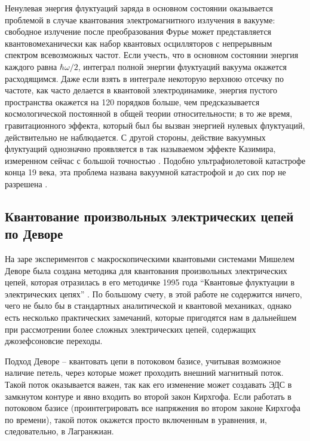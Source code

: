 \documentclass[14pt, a4paper]{extreport}
\numberwithin{equation}{section}
\begin{document}
Ненулевая энергия флуктуаций заряда в основном состоянии оказывается проблемой в случае квантования электромагнитного излучения в вакууме: свободное излучение после преобразования Фурье может представляется квантовомеханически как набор квантовых осцилляторов с непрерывным спектром всевозможных частот. Если учесть, что в основном состоянии энергия каждого равна $\hbar \omega/2$, интеграл полной энергии флуктуаций вакуума окажется расходящимся. Даже если взять в интеграле некоторую верхнюю отсечку по частоте, как часто делается в квантовой электродинамике, энергия пустого пространства окажется на 120 порядков больше, чем предсказывается космологической постоянной в общей теории относительности; в то же время, гравитационного эффекта, который был бы вызван энергией нулевых флуктуаций, действительно не наблюдается. С другой стороны, действие вакуумных флуктуаций однозначно проявляется в так называемом эффекте Казимира, измеренном сейчас с большой точностью \cite{zou2013casimir}. Подобно ультрафиолетовой катастрофе конца 19 века, эта проблема названа вакуумной катастрофой и до сих пор не разрешена \cite{adler1995vacuum}.

\subsection{Квантование произвольных электрических цепей по Деворе}

На заре экспериментов с макроскопическими квантовыми системами Мишелем Деворе была создана методика для квантования произвольных электрических цепей, которая отразилась в его методичке 1995 года ``Квантовые флуктуации в электрических цепях'' \cite{devoret1995quantum}. По большому счету, в этой работе не содержится ничего, чего не было бы в стандартных аналитической и квантовой механиках, однако есть несколько практических замечаний, которые пригодятся нам в дальнейшем при рассмотрении более сложных электрических цепей, содержащих джозефсоновсие переходы.

Подход Деворе -- квантовать цепи в потоковом базисе, учитывая возможное наличие петель, через которые может проходить внешний магнитный поток. Такой поток оказывается важен, так как его изменение может создавать ЭДС в замкнутом контуре и явно входить во второй закон Кирхгофа. Если работать в потоковом базисе (проинтегрировать все напряжения во втором законе Кирхгофа по времени), такой поток окажется просто включенным в уравнения, и, следовательно, в Лагранжиан. 
\end{document}
